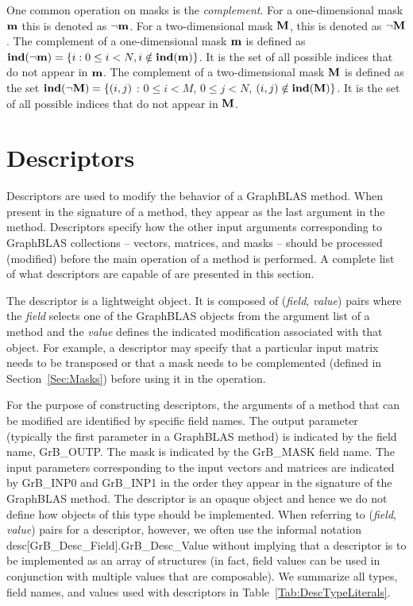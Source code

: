 One common operation on masks is the \emph{complement}.
For a one-dimensional mask ${\bf m}$ this is denoted as
$\neg{\bf m}$. For a two-dimensional mask ${\bf M}$, this is denoted as
$\neg{\bf M}$.  The complement of a one-dimensional
mask ${\bf m}$ is defined as $\mathbf{ind}(\neg{\bf m}) = \{i : 0
\leq i < N, i \notin \mathbf{ind}({\bf m}) \}$.  It is the set of all
possible indices that do not appear in ${\bf m}$.  The 
complement of a two-dimensional mask ${\bf M}$ is defined as the set
$\mathbf{ind}(\neg{\bf M}) = \{(i,j)$ : $0 \leq i < M$, $0 \leq j < N$,
$(i,j) \notin \mathbf{ind}({\bf M}) \}$.  It is the set of all possible
indices that do not appear in ${\bf M}$.

\section{Descriptors}
\label{Sec:Descriptors}

Descriptors are used to modify the behavior of a GraphBLAS method.
When present in the signature of a method, they appear as the last
argument in the method.  Descriptors specify how the other input arguments
corresponding to GraphBLAS collections -- vectors, matrices, and masks
-- should be processed (modified) before the main operation of a method
is performed.  A complete list of
what descriptors are capable of are presented in this section.

The descriptor is a lightweight object.  It is composed of (\emph{field},
\emph{value}) pairs where the \emph{field} selects one of the GraphBLAS objects
from the argument list of a method and the \emph{value} defines the
indicated modification associated with that object.  For example,
a descriptor may specify that a particular input matrix needs to be
transposed or that a mask needs to be complemented (defined
in Section~\ref{Sec:Masks}) before using it in the operation.

For the purpose of constructing descriptors, the arguments of a method
that can be modified are identified by specific field names. The output
parameter (typically the first parameter in a GraphBLAS method) is
indicated by the field name, {\sf GrB\_OUTP}.  The mask is indicated
by the {\sf GrB\_MASK} field name. The input parameters corresponding
to the input vectors and matrices are indicated by {\sf GrB\_INP0}
and {\sf GrB\_INP1} in the order they appear in the signature of the
GraphBLAS method.  The descriptor is an opaque object and hence we do not
define how objects of this type should be implemented.   When referring to
(\emph{field}, \emph{value}) pairs for a descriptor, however, we often use the informal
notation {\sf desc[GrB\_Desc\_Field].GrB\_Desc\_Value} without implying
that a descriptor is to be implemented as an array of structures (in fact,
field values can be used in conjunction with multiple values that are composable).
We summarize all types, field names, and values used with descriptors
in Table~\ref{Tab:DescTypeLiterals}.

